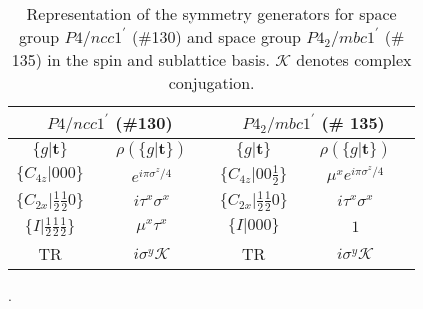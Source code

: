 \documentclass[prb,aps,amssymb,twocolumn,notitlepage]{revtex4-2}
\begin{document}
\begin{table}[ht]
\caption{Representation of the symmetry generators for space group $P4/ncc1^\prime$ (\#130) and space group $P4_2/mbc1^\prime$ (\# 135) in the spin and sublattice basis. $\mathcal{K}$ denotes complex conjugation.} %
\centering %
\renewcommand*{\arraystretch}{1.4}
\begin{tabular}{c c c c | c c c c} %
\hline\hline %
\multicolumn{4}{c}{$P4/ncc1^\prime$ (\#130)} &\multicolumn{4}{c}{$P4_2/mbc1^\prime$ (\# 135)}\\[0.5ex]
\hline %
$\{g|\mathbf{t}\}$ & & $\rho\left(\{g|\mathbf{t}\}\right)$ & & $\{g|\mathbf{t}\}$ & & $\rho\left(\{g|\mathbf{t}\}\right)$ & \\ %
$\{C_{4z}|000\}$ & &  $e^{i\pi\sigma^z/4}$ & &  $\{C_{4z}|00\tfrac{1}{2}\}$ & & $\mu^xe^{i\pi\sigma^z/4}$ &  \\
$\{C_{2x}|\tfrac{1}{2}\tfrac{1}{2}0\}$ & &  $i\tau^x\sigma^x$ & &  $\{C_{2x}|\tfrac{1}{2}\tfrac{1}{2}0\}$ & &  $i\tau^x\sigma^x$ & \\
$\{I|\tfrac{1}{2}\tfrac{1}{2}\tfrac{1}{2}\}$ & & $\mu^x\tau^x$ & & $\{I|000\}$ & 
 & $1$ &  \\
TR & & $i\sigma^y \mathcal{K}$ & & TR &  & $i\sigma^y \mathcal{K}$ & \\ [1ex] %
\hline %
\end{tabular}
\label{table:generatorsGamma} %
\end{table}
. 
\end{document}
